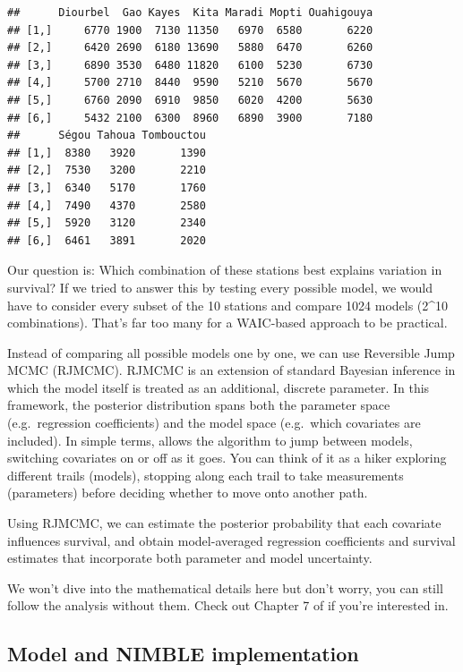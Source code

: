 \documentclass[
  12pt,
]{krantz}
\begin{document}
\begin{verbatim}
##      Diourbel  Gao Kayes  Kita Maradi Mopti Ouahigouya
## [1,]     6770 1900  7130 11350   6970  6580       6220
## [2,]     6420 2690  6180 13690   5880  6470       6260
## [3,]     6890 3530  6480 11820   6100  5230       6730
## [4,]     5700 2710  8440  9590   5210  5670       5670
## [5,]     6760 2090  6910  9850   6020  4200       5630
## [6,]     5432 2100  6300  8960   6890  3900       7180
##      Ségou Tahoua Tombouctou
## [1,]  8380   3920       1390
## [2,]  7530   3200       2210
## [3,]  6340   5170       1760
## [4,]  7490   4370       2580
## [5,]  5920   3120       2340
## [6,]  6461   3891       2020
\end{verbatim}

Our question is: Which combination of these stations best explains variation in survival? If we tried to answer this by testing every possible model, we would have to consider every subset of the 10 stations and compare 1024 models (2\^{}10 combinations). That's far too many for a WAIC-based approach to be practical.

Instead of comparing all possible models one by one, we can use Reversible Jump MCMC (RJMCMC). RJMCMC is an extension of standard Bayesian inference in which the model itself is treated as an additional, discrete parameter. In this framework, the posterior distribution spans both the parameter space (e.g.~regression coefficients) and the model space (e.g.~which covariates are included). In simple terms, allows the algorithm to jump between models, switching covariates on or off as it goes. You can think of it as a hiker exploring different trails (models), stopping along each trail to take measurements (parameters) before deciding whether to move onto another path.

Using RJMCMC, we can estimate the posterior probability that each covariate influences survival, and obtain model-averaged regression coefficients and survival estimates that incorporate both parameter and model uncertainty.

We won't dive into the mathematical details here but don't worry, you can still follow the analysis without them. Check out Chapter 7 of \citeauthor{king_bayesian_2009} \citetext{\citeyear{king_bayesian_2009}; \citealp[see also][]{gimenez2009winbugs}} if you're interested in.

\subsection{Model and NIMBLE implementation}\label{model-and-nimble-implementation}
\end{document}
